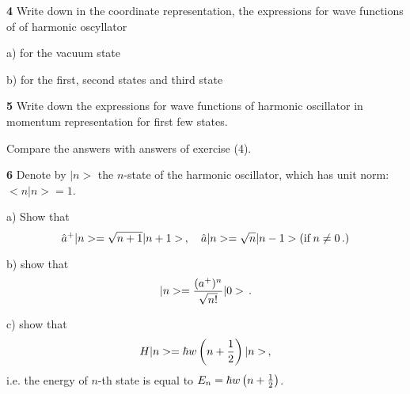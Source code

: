 \m


{\bf 4} Write down in the coordinate representation,
the expressions for wave functions of  of harmonic oscyllator 

a) for the   vacuum state

b) for the first, second  states  and third state


\m

{\bf 5}  Write down the expressions for
wave functions of harmonic oscillator in momentum representation
for first few states.

   Compare the answers with answers of exercise (4).

\m


{\bf 6}   Denote by $|n>$ the $n$-state of the harmonic oscillator,
which has unit norm: $<n|n>=1$.


  a)      Show that
       $$
  \hat a^+|n>=\sqrt {n+1}|n+1>\,,\quad
  \hat a|n>=\sqrt {n}|n-1> ({\rm if}\, n\not=0\,.)
       $$

b)  show that   
       $$
   |n>={(a^+)^n\over \sqrt {n!}}|0>\,.
        $$

c) show that
          $$
       H|n>=\hbar w\left(n+{1\over 2}\right)|n>\,,
          $$
i.e. the energy of $n$-th state is equal to
$E_n=\hbar w\left(n+{1\over 2}\right)$.
\bye


 
